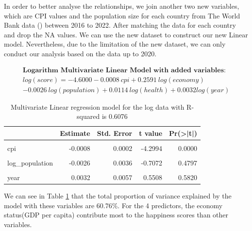 \documentclass[11pt,a4paper,]{article}
\begin{document}
In order to better analyse the relationships, we join another two new variables, which are CPI values and the population size for each country from The World Bank data (\textcite{world2022}) between 2016 to 2022. After matching the data for each country and drop the NA values. We can use the new dataset to construct our new Linear model. Nevertheless, due to the limitation of the new dataset, we can only conduct our analysis based on the data up to 2020.

\[
\begin{aligned}
\textbf{Logarithm Multivariate Linear Model with added variables}:\\
log(score)= -4.6000-0.0008\ cpi+0.2591\ log(economy)\\-0.0026\ log(population)+0.0114\ log(health)+0.0032log(year)
\end{aligned}
\]

\begin{table}

\caption{\label{tab:mle}Multivariate Linear regression model for the log data with R-squared is 0.6076}
\centering
\begin{tabular}[t]{l|r|r|r|r}
\hline
  & Estimate & Std. Error & t value & Pr(>|t|)\\
\hline
\cellcolor{gray!6}{(Intercept)} & \cellcolor{gray!6}{-4.5999} & \cellcolor{gray!6}{11.5632} & \cellcolor{gray!6}{-0.3978} & \cellcolor{gray!6}{0.6909}\\
\hline
cpi & -0.0008 & 0.0002 & -4.2994 & 0.0000\\
\hline
\cellcolor{gray!6}{log\_eco} & \cellcolor{gray!6}{0.2591} & \cellcolor{gray!6}{0.0094} & \cellcolor{gray!6}{27.5487} & \cellcolor{gray!6}{0.0000}\\
\hline
log\_population & -0.0026 & 0.0036 & -0.7072 & 0.4797\\
\hline
\cellcolor{gray!6}{log\_health} & \cellcolor{gray!6}{0.0114} & \cellcolor{gray!6}{0.0042} & \cellcolor{gray!6}{2.7419} & \cellcolor{gray!6}{0.0063}\\
\hline
year & 0.0032 & 0.0057 & 0.5508 & 0.5820\\
\hline
\end{tabular}
\end{table}

We can see in Table \ref{tab:mle} that the total proportion of variance explained by the model with these variables are 60.76\%. For the 4 predictors, the economy status(GDP per capita) contribute most to the happiness scores than other variables.
\end{document}
